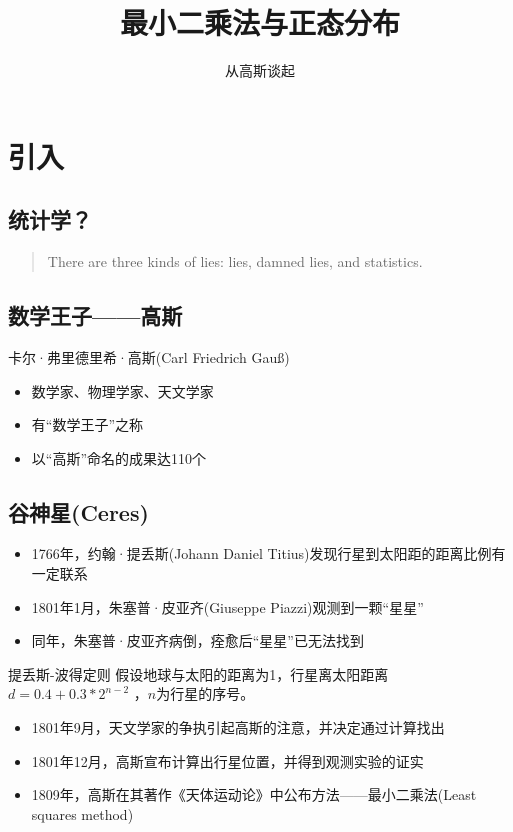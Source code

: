 \documentclass[14pt,hyperref={CJKbookmarks=true}]{beamer}
\begin{document}
\kaishu
\title[期中展示]{最小二乘法与正态分布}
\subtitle[期中展示]{从高斯谈起}
\begin{frame}
\titlepage
\end{frame}
\section{引入}
\subsection{统计学？}
\begin{frame}
\begin{quote}
There are three kinds of lies: lies, damned lies,
and statistics.
\end{quote}
\end{frame}
\subsection{数学王子——高斯}
\begin{frame}
卡尔·弗里德里希·高斯(Carl Friedrich Gauß)
\begin{itemize}
\item 数学家、物理学家、天文学家
\item 有“数学王子”之称
\item 以“高斯”命名的成果达110个
\end{itemize}
\end{frame}
\subsection{谷神星(Ceres)}
\begin{frame}
\begin{itemize}
\item 1766年，约翰·提丢斯(Johann Daniel Titius)发现行星到太阳距的距离比例有一定联系
\item 1801年1月，朱塞普·皮亚齐(Giuseppe Piazzi)观测到一颗“星星”
\item 同年，朱塞普·皮亚齐病倒，痊愈后“星星”已无法找到
\end{itemize}
\begin{theorem}{提丢斯-波得定则}
假设地球与太阳的距离为1，行星离太阳距离 $d = 0.4 + 0.3*2^{n-2}$ ，$n$为行星的序号。
\end{theorem}
\end{frame}
\begin{frame}
\begin{itemize}
\item 1801年9月，天文学家的争执引起高斯的注意，并决定通过计算找出
\item 1801年12月，高斯宣布计算出行星位置，并得到观测实验的证实
\item 1809年，高斯在其著作《天体运动论》中公布方法——最小二乘法(Least squares method)
\end{itemize}
\end{frame}
\end{document}
